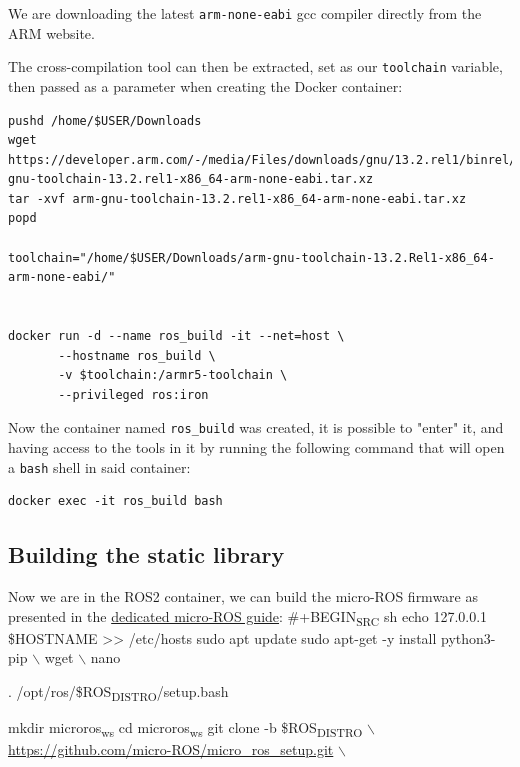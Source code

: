 \documentclass[10pt]{article}
\begin{document}
We are downloading the latest \texttt{arm-none-eabi} gcc compiler directly from the ARM website.

The cross-compilation tool can then be extracted, set as our \texttt{toolchain} variable,
then passed as a parameter when creating the Docker container:
\begin{verbatim}
pushd /home/$USER/Downloads
wget https://developer.arm.com/-/media/Files/downloads/gnu/13.2.rel1/binrel/arm-gnu-toolchain-13.2.rel1-x86_64-arm-none-eabi.tar.xz
tar -xvf arm-gnu-toolchain-13.2.rel1-x86_64-arm-none-eabi.tar.xz
popd

toolchain="/home/$USER/Downloads/arm-gnu-toolchain-13.2.Rel1-x86_64-arm-none-eabi/"


docker run -d --name ros_build -it --net=host \
       --hostname ros_build \
       -v $toolchain:/armr5-toolchain \
       --privileged ros:iron
\end{verbatim}

Now the container named \texttt{ros\_build} was created, it is possible to "enter" it, and having access
to the tools in it by running the following command that will open a \texttt{bash} shell in said container:
\begin{verbatim}
docker exec -it ros_build bash
\end{verbatim}

\subsection{Building the static library}
\label{sec:org5e77326}
Now we are in the ROS2 container, we can build the micro-ROS firmware as presented
in the \href{https://micro.ros.org/docs/tutorials/advanced/create\\\_custom\\\_static\\\_library}{dedicated micro-ROS guide}:
\#+BEGIN\textsubscript{SRC} sh
echo 127.0.0.1 \$HOSTNAME >> /etc/hosts
sudo apt update 
sudo apt-get -y install python3-pip $\backslash$
     wget $\backslash$
     nano

. /opt/ros/\$ROS\textsubscript{DISTRO}/setup.bash

mkdir microros\textsubscript{ws}
cd microros\textsubscript{ws}
git clone -b \$ROS\textsubscript{DISTRO} $\backslash$
    \url{https://github.com/micro-ROS/micro\_ros\_setup.git} $\backslash$
\clearpage
\end{document}
